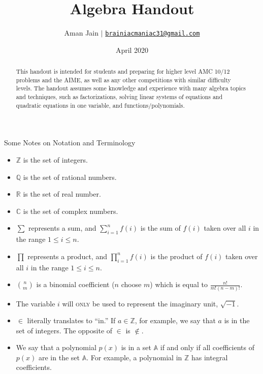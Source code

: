 \documentclass[12pt]{article}
\title{Algebra Handout}
\author{Aman Jain $\big\vert$ \texttt{\href{mailto:brainiacmaniac31@gmail.com}{brainiacmaniac31@gmail.com}} }
\date{April 2020}
\begin{document}
\setlength{\parindent}{0.25in}
\pagestyle{fancy}
\fancyhead{}
\begin{titlingpage}
        \maketitle
        
        \begin{abstract}
            This handout is intended for students and preparing for higher level AMC 10/12 problems and the AIME, as well as any other competitions with similar difficulty levels. The handout assumes some knowledge and experience with many algebra topics and techniques, such as factorizations, solving linear systems of equations and quadratic equations in one variable, and functions/polynomials.
        \end{abstract}
        
\end{titlingpage}
\begin{center}
    {\LARGE Some Notes on Notation and Terminology}
\end{center}
\begin{itemize}
    \item $\mathbb{Z}$ is the set of integers.
    \item $\mathbb{Q}$ is the set of rational numbers.
    \item $\mathbb{R}$ is the set of real number.
    \item $\mathbb{C}$ is the set of complex numbers.
    \item $\sum$ represents a sum, and $\displaystyle\sum_{i=1}^{n}f(i)$ is the sum of $f(i)$ taken over all $i$ in the range $1\le i\le n$.
    \item $\prod$ represents a product, and $\displaystyle\prod_{i=1}^{n}f(i)$ is the product of $f(i)$ taken over all $i$ in the range $1\le i\le n$.
    \item $\binom{n}{m}$ is a binomial coefficient ($n$ choose $m$) which is equal to $\frac{n!}{m!(n-m)!}$.
    \item The variable $i$ will \textsc{only} be used to represent the imaginary unit, $\sqrt{-1}$.
    \item $\in$ literally translates to ``in.'' If $a\in\mathbb{Z}$, for example, we say that $a$ is in the set of integers. The opposite of $\in$ is $\not\in$.
    \item We say that a polynomial $p(x)$ is in a set $\mathbb{A}$ if and only if all coefficients of $p(x)$ are in the set $\mathbb{A}$. For example, a polynomial in $\mathbb{Z}$ has integral coefficients.
\end{itemize}
\end{document}
